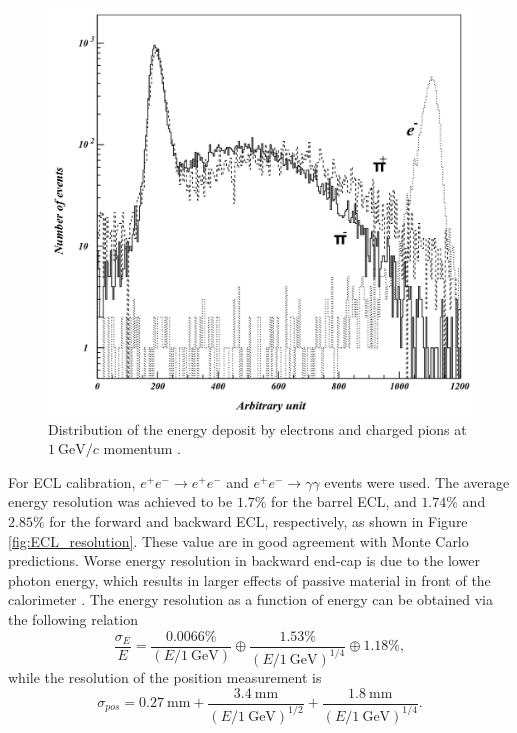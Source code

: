 \documentclass[headings=standardclasses,headings=big,oneside,a4paper,openany,12pt]{scrbook}
\newcommand {\e}[1]{\mathrm{~#1}}
\begin{document}
\begin{figure}[H]
	\centering
	\captionsetup{width=0.8\linewidth}
	\includegraphics[width=0.6\linewidth]{fig/setup/ECL_deposit}
	\caption{Distribution of the energy deposit by electrons and charged pions at $1\e{GeV}/c$ momentum \cite{ABASHIAN2002117}.}
	\label{fig:ECL_deposit}
\end{figure}

For ECL calibration, $e^+e^- \to e^+e^-$ and $e^+e^- \to \gamma\gamma$ events were used. The average energy resolution was achieved to be $1.7\%$ for the barrel ECL, and $1.74\%$ and $2.85\%$ for the forward and backward ECL, respectively, as shown in Figure \ref{fig:ECL_resolution}. These value are in good agreement with Monte Carlo predictions. Worse energy resolution in backward end-cap is due to the lower photon energy, which results in larger effects of passive material in front of the calorimeter \cite{haba2004letter}. The energy resolution as a function of energy can be obtained via the following relation
\begin{equation}
\frac{\sigma_E}{E} = \frac{0.0066\%}{\left(E/1\e{GeV}\right)}\oplus\frac{1.53\%}{\left( E/1\e{GeV}\right)^{1/4}}\oplus 1.18\%,
\end{equation}
while the resolution of the position measurement is
\begin{equation}
\sigma_{pos} = 0.27\e{mm}+\frac{3.4\e{mm}}{\left( E/1\e{GeV}\right)^{1/2}} + \frac{1.8\e{mm}}{\left( E/1\e{GeV}\right)^{1/4}}.
\end{equation}
\end{document}
